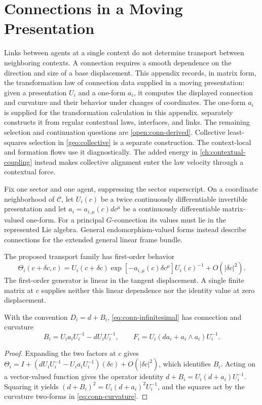 \chapter{Connections in a Moving Presentation}
\label{app:connection}

Links between agents at a single context do not determine transport between neighboring contexts. A connection requires a smooth dependence on the direction and size of a base displacement. This appendix records, in matrix form, the transformation law of connection data supplied in a moving presentation: given a presentation $U_i$ and a one-form $a_i$, it computes the displayed connection and curvature and their behavior under changes of coordinates. The one-form $a_i$ is supplied for the transformation calculation in this appendix.  separately constructs it from regular contextual laws, interfaces, and links. The remaining selection and continuation questions are \cref{open:conn-derived}. Collective least-squares selection in \cref{geo:collective} is a separate construction. The context-local and formation flows use it diagnostically. The added energy in \cref{ch:contextual-coupling} instead makes collective alignment enter the law velocity through a contextual force.

Fix one sector and one agent, suppressing the sector superscript. On a coordinate neighborhood of $\mathcal C$, let $U_i(c)$ be a twice continuously differentiable invertible presentation and let
$a_i=a_{i,\mu}(c)dc^\mu$ be a continuously differentiable matrix-valued one-form. For a principal $G$-connection its values must lie in the represented Lie algebra. General endomorphism-valued forms instead describe connections for the extended general linear frame bundle.

The proposed transport family has first-order behavior
\begin{equation}
\Theta_i(c+\delta c,c)
=U_i(c+\delta c)\exp[-a_{i,\mu}(c)\delta c^\mu]U_i(c)^{-1}
+O(|\delta c|^2).
\label{eq:conn-infinitesimal}
\end{equation}
The first-order generator is linear in the tangent displacement. A single finite matrix at $c$ supplies neither this linear dependence nor the identity value at zero displacement.

With the convention $D_i=d+B_i$, \cref{eq:conn-infinitesimal} has connection and curvature
\begin{equation}
B_i=U_i a_iU_i^{-1}-dU_iU_i^{-1},\qquad
F_i=U_i(da_i+a_i\wedge a_i)U_i^{-1}.
\label{eq:conn-curvature}
\end{equation}
\begin{proof}
Expanding the two factors at $c$ gives
$\Theta_i=I+(dU_iU_i^{-1}-U_i a_iU_i^{-1})(\delta c)+O(|\delta c|^2)$,
which identifies $B_i$. Acting on a vector-valued function gives the operator identity
$d+B_i=U_i(d+a_i)U_i^{-1}$. Squaring it yields
$(d+B_i)^2=U_i(d+a_i)^2U_i^{-1}$, and the squares act by the curvature two-forms in \cref{eq:conn-curvature}.
\end{proof}

